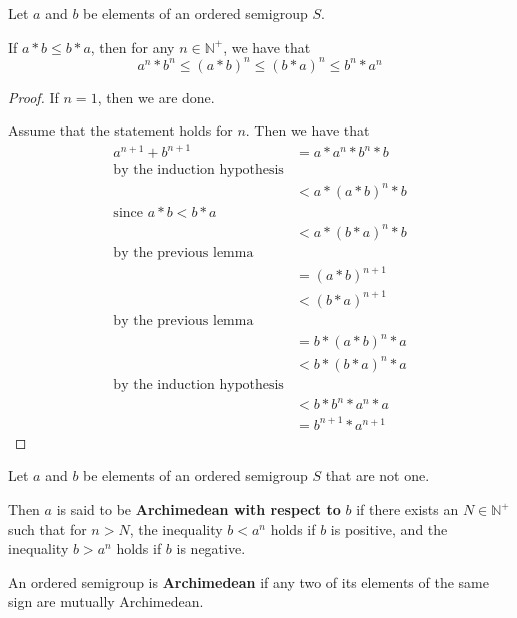 \begin{lemma}\label{thm:comm_ineq}\leanok
Let $a$ and $b$ be elements of an ordered semigroup $S$.

If $a * b \le b * a$, then for any $n\in \mathbb{N}^+$, we have that
\[a^n * b^n \le (a*b)^n \le (b*a)^n \le b^n * a^n\]
\end{lemma}
\begin{proof}
If $n=1$, then we are done.

Assume that the statement holds for $n$.
Then we have that
\begin{align}
a^{n+1} + b^{n+1} &= a * a^n * b^n * b \\
\text{by the induction hypothesis}\\
&< a * (a * b)^n * b \\
\text{since $a*b < b*a$}\\
&< a * (b * a)^n * b \\
\text{by the previous lemma}\\
&= (a * b)^{n+1} \\
&< (b * a)^{n+1} \\
\text{by the previous lemma}\\
&= b * (a * b)^n * a \\
&< b * (b * a)^n * a \\
\text{by the induction hypothesis}\\
&< b * b^n * a^n * a \\
&= b^{n+1} * a^{n+1}
\end{align}
\end{proof}

\begin{definition}\label{def:arch_wrt}\leanok
{}
Let $a$ and $b$ be elements of an ordered semigroup $S$ that are not one.

Then $a$ is said to be \textbf{Archimedean with respect to} $b$
if there exists an $N\in \mathbb{N}^+$ such that for $n > N$,
the inequality $b < a^n$ holds if $b$ is positive,
and the inequality $b > a^n$ holds if $b$ is negative.
\end{definition}

\begin{definition}\label{def:arch}\leanok
{}
An ordered semigroup is \textbf{Archimedean} if any two of its elements
of the same sign are mutually Archimedean.
\end{definition}

